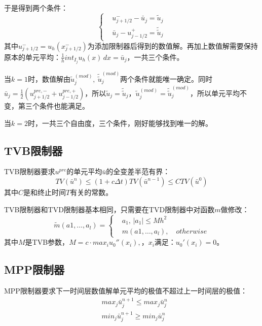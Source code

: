\documentclass[12pt, a4paper]{ctexart}
\begin{document}
	于是得到两个条件：
	\begin{equation*}
	\begin{cases}
	& u_{j+1/2}^- - \bar{u}_j = \tilde{u}_j\\
	& \bar{u}_j - u_{j-1/2}^+ = \tilde{\tilde{u}}_j
	\end{cases}
	\end{equation*}
	其中$u_{j+1/2}^- = u_h(x_{j+1/2}^-)$为添加限制器后得到的数值解。再加上数值解需要保持原本的单元平均：$\frac{1}{h}int_{I_j} u_h(x) \, dx = \bar{u}_j$，一共三个条件。
	
	当$k = 1$时，数值解由$\tilde{u}_j^{(mod)}, \  \tilde{\tilde{u}}_j^{(mod)}$两个条件就能唯一确定。同时$\bar{u}_j = \frac{1}{2} (u_{j+1/2}^{pre,-} + u_{j-1/2}^{pre,+})$，所以$\tilde{u}_j = \tilde{\tilde{u}}_j$，$\tilde{u}_j^{(mod)} = \tilde{\tilde{u}}_j^{(mod)}$，所以单元平均不变，第三个条件也能满足。
	
	当$k=2$时，一共三个自由度，三个条件，刚好能够找到唯一的解。
	
	\subsection{TVB限制器}
	
	TVB限制器要求$u^{pre}$的单元平均$\bar{u}$的全变差半范有界：
	$$
	TV(\bar{u}^n) \leq (1 + c \Delta t) TV(\bar{u}^{n-1}) \leq C TV(\bar{u}^0)
	$$
	其中$C$是和终止时间$T$有关的常数。
	
	TVB限制器和TVD限制器基本相同，只需要在TVD限制器中对函数$m$做修改：
	\begin{equation*}
	\tilde{m}(a1, \dots, a_l) = 
	\begin{cases}
	& a_1 , \, |a_1| \leq M h^2\\
	& m(a1, \dots, a_l) , \quad otherwise
	\end{cases}
	\end{equation*}
	其中$M$是TVB参数，$M = c \cdot max_i u_0''(x_i),$，$x_i$满足：$u_0'(x_i) = 0$。
	
	\subsection{MPP限制器}
	
	MPP限制器要求下一时间层数值解单元平均的极值不超过上一时间层的极值：
	\begin{align*}
	& max_j \bar{u}_j^{n+1} \leq max_j \bar{u}_j^n\\
	& min_j \bar{u}_j^{n+1} \ge min_j \bar{u}_j^n
	\end{align*}
	
\end{document}
